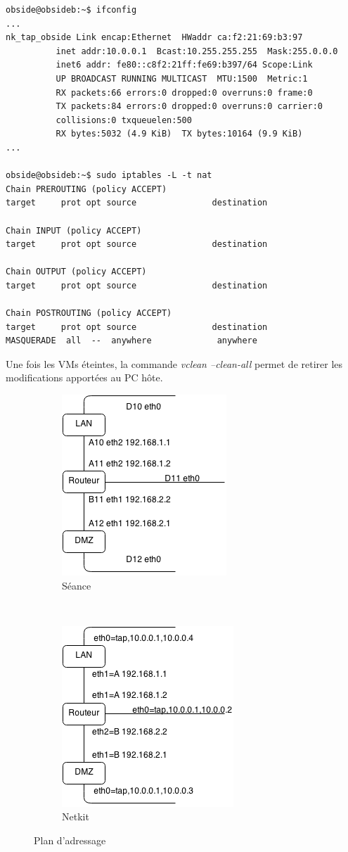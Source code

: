 \documentclass[frenchb, 11pt]{article}
\begin{document}
\begin{lstlisting}
obside@obsideb:~$ ifconfig
...
nk_tap_obside Link encap:Ethernet  HWaddr ca:f2:21:69:b3:97
          inet addr:10.0.0.1  Bcast:10.255.255.255  Mask:255.0.0.0
          inet6 addr: fe80::c8f2:21ff:fe69:b397/64 Scope:Link
          UP BROADCAST RUNNING MULTICAST  MTU:1500  Metric:1
          RX packets:66 errors:0 dropped:0 overruns:0 frame:0
          TX packets:84 errors:0 dropped:0 overruns:0 carrier:0
          collisions:0 txqueuelen:500
          RX bytes:5032 (4.9 KiB)  TX bytes:10164 (9.9 KiB)
...

obside@obsideb:~$ sudo iptables -L -t nat
Chain PREROUTING (policy ACCEPT)
target     prot opt source               destination

Chain INPUT (policy ACCEPT)
target     prot opt source               destination

Chain OUTPUT (policy ACCEPT)
target     prot opt source               destination

Chain POSTROUTING (policy ACCEPT)
target     prot opt source               destination
MASQUERADE  all  --  anywhere             anywhere
\end{lstlisting}
Une fois les VMs éteintes, la commande \emph{vclean --clean-all} permet de retirer les modifications apportées au PC hôte.

\begin{figure}[h!]
	\centering
	\begin{subfigure}[b]{0.4\textwidth}
		\includegraphics[scale=0.80]{sch1.png}
		\caption{Séance}
	\end{subfigure}%
	~
	\begin{subfigure}[b]{0.4\textwidth}
	\includegraphics[scale=0.80]{sch2.png}
	\caption{Netkit}
	\label{fig:planadrnetkit}
	\end{subfigure}
	\caption{Plan d'adressage}
\end{figure}
\end{document}
